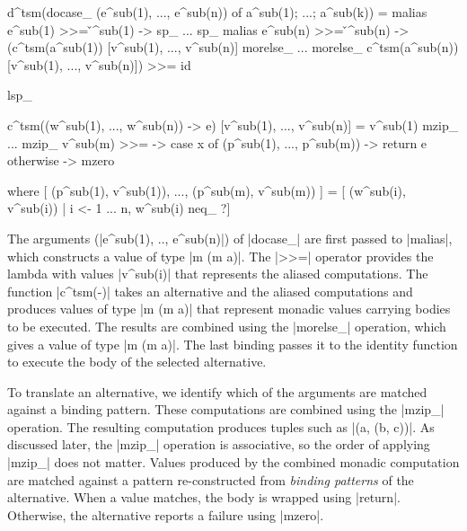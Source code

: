 \documentclass{sigplanconf}
\begin{document}
\begin{code}
d^tsm(docase_ (e^sub(1), ..., e^sub(n)) of a^sub(1); ...; a^sub(k)) =
  malias e^sub(1) >>= \v^sub(1) -> sp_ ... sp_ malias e^sub(n) >>= \v^sub(n) ->
  (c^tsm(a^sub(1)) [v^sub(1), ..., v^sub(n)] morelse_ ... morelse_ c^tsm(a^sub(n)) [v^sub(1), ..., v^sub(n)]) >>= id

lsp_

c^tsm((w^sub(1), ..., w^sub(n)) -> e) [v^sub(1), ..., v^sub(n)] = 
  v^sub(1) mzip_ ... mzip_ v^sub(m) >>= \x -> case x of 
    (p^sub(1), ..., p^sub(m))  -> return e
    otherwise                  -> mzero

  where  [ (p^sub(1), v^sub(1)), ..., (p^sub(m), v^sub(m)) ] = 
           [ (w^sub(i), v^sub(i)) | i <- 1 ... n, w^sub(i) neq_ ?]
\end{code}
The arguments (|e^sub(1), .., e^sub(n)|) of |docase_| are first passed to |malias|, which
constructs a value of type |m (m a)|. The |>>=| operator provides the lambda with 
values |v^sub(i)| that represents the aliased computations. The function |c^tsm(-)| takes an alternative
and the aliased computations and produces values of type |m (m a)| that represent monadic values 
carrying bodies to be executed. The results are combined using the |morelse_| operation, which 
gives a value of type |m (m a)|. The last binding passes it to the identity function to execute 
the body of the selected alternative.

To translate an alternative, we identify which of the arguments are matched against
a binding pattern. These computations are combined using the |mzip_| operation. The resulting 
computation produces tuples such as |(a, (b, c))|. As discussed later, the |mzip_| operation is 
associative, so the order of applying |mzip_| does not matter. Values produced by the combined monadic computation 
are matched against a pattern re-constructed from \textit{binding patterns} of the alternative. 
When a value matches, the body is wrapped using |return|. Otherwise, the alternative 
reports a failure using |mzero|.

\end{document}
